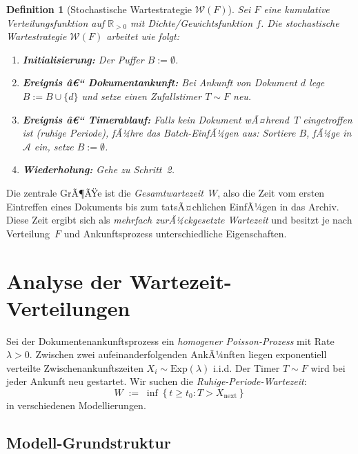 ﻿\documentclass[12pt, a4paper]{article}
\newtheorem{definition}[theorem]{Definition}
\newcommand{\Exp}{\mathrm{Exp}}
\begin{document}
\begin{definition}[Stochastische Wartestrategie $\mathcal{W}(F)$]
\label{def:waitstrat}
Sei $F$ eine kumulative Verteilungsfunktion auf $\mathbb{R}_{>0}$ mit
Dichte/Gewichtsfunktion $f$. Die \emph{stochastische Wartestrategie}
$\mathcal{W}(F)$ arbeitet wie folgt:

\begin{enumerate}[label=\arabic*.,noitemsep]
  \item \textbf{Initialisierung:} Der Puffer $B := \emptyset$.
  \item \textbf{Ereignis â€“ Dokumentankunft:} Bei Ankunft von Dokument $d$
        lege $B := B \cup \{d\}$ und setze einen Zufallstimer
        $T \sim F$ neu.
  \item \textbf{Ereignis â€“ Timerablauf:} Falls kein Dokument wÃ¤hrend~$T$
        eingetroffen ist (\emph{ruhige Periode}), fÃ¼hre das
        Batch-EinfÃ¼gen aus: Sortiere $B$, fÃ¼ge in $\mathcal{A}$ ein,
        setze $B := \emptyset$.
  \item \textbf{Wiederholung:} Gehe zu Schritt~2.
\end{enumerate}
\end{definition}

Die zentrale GrÃ¶ÃŸe ist die \emph{Gesamtwartezeit}~$W$, also die Zeit vom
ersten Eintreffen eines Dokuments bis zum tatsÃ¤chlichen EinfÃ¼gen in das Archiv.
Diese Zeit ergibt sich als \emph{mehrfach zurÃ¼ckgesetzte Wartezeit} und besitzt
je nach Verteilung~$F$ und Ankunftsprozess unterschiedliche Eigenschaften.

\section{Analyse der Wartezeit-Verteilungen}\label{sec:distributions}

Sei der Dokumentenankunftsprozess ein \emph{homogener Poisson-Prozess} mit
Rate $\lambda > 0$. Zwischen zwei aufeinanderfolgenden AnkÃ¼nften liegen
exponentiell verteilte Zwischenankunftszeiten $X_i \sim \Exp(\lambda)$
i.i.d. Der Timer $T \sim F$ wird bei jeder Ankunft neu gestartet. Wir suchen
die \emph{Ruhige-Periode-Wartezeit}:
\[
  W \;:=\; \inf\!\left\{t \geq t_0 : T > X_{\text{next}}\right\}
\]
in verschiedenen Modellierungen.

\subsection{Modell-Grundstruktur}
\end{document}
